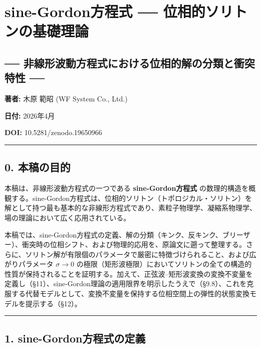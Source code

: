 \documentclass[a4paper,11pt]{ltjsarticle}
\begin{document}
\section{sine-Gordon方程式 ──
位相的ソリトンの基礎理論}\label{sine-gordonux65b9ux7a0bux5f0f-ux4f4dux76f8ux7684ux30bdux30eaux30c8ux30f3ux306eux57faux790eux7406ux8ad6}

\subsection{── 非線形波動方程式における位相的解の分類と衝突特性
──}\label{ux975eux7ddaux5f62ux6ce2ux52d5ux65b9ux7a0bux5f0fux306bux304aux3051ux308bux4f4dux76f8ux7684ux89e3ux306eux5206ux985eux3068ux885dux7a81ux7279ux6027}

\textbf{著者:} 木原 範昭 (WF System Co., Ltd.)

\textbf{日付:} 2026年4月

\textbf{DOI:} 10.5281/zenodo.19650966

\begin{center}\rule{0.5\linewidth}{0.5pt}\end{center}

\subsection{0. 本稿の目的}\label{ux672cux7a3fux306eux76eeux7684}

本稿は、非線形波動方程式の一つである \textbf{sine-Gordon方程式}
の数理的構造を概観する。sine-Gordon方程式は、位相的ソリトン（トポロジカル・ソリトン）を解として持つ最も基本的な非線形方程式であり、素粒子物理学、凝縮系物理学、場の理論において広く応用されている。

本稿では、sine-Gordon方程式の定義、解の分類（キンク、反キンク、ブリーザー）、衝突時の位相シフト、および物理的応用を、原論文に遡って整理する。さらに、ソリトン解が有限個のパラメータで厳密に特徴づけられること、および広がりパラメータ
\(\sigma \to 0\)
の極限（矩形波極限）においてソリトンの全ての構造的性質が保持されることを証明する。加えて、正弦波--矩形波変換の変換不変量を定義し（§11）、sine-Gordon理論の適用限界を明示したうえで（§9.8）、これを克服する代替モデルとして、変換不変量を保持する位相空間上の弾性的状態変換モデルを提示する（§12）。

\begin{center}\rule{0.5\linewidth}{0.5pt}\end{center}

\subsection{1.
sine-Gordon方程式の定義}\label{sine-gordonux65b9ux7a0bux5f0fux306eux5b9aux7fa9}
\end{document}
